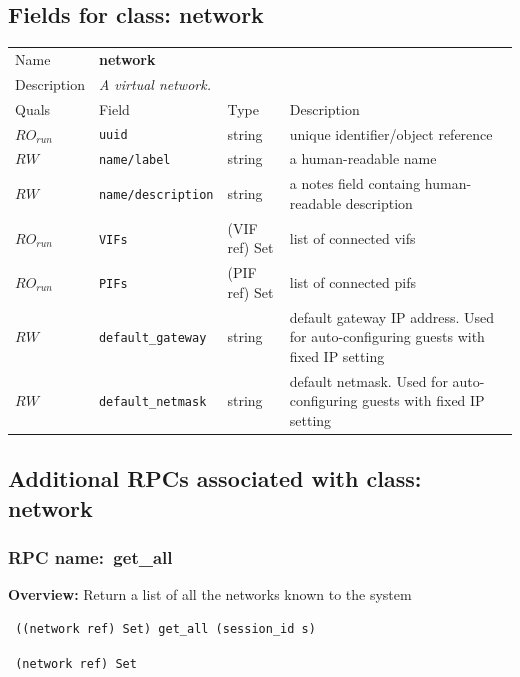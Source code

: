 \subsection{Fields for class: network}
\begin{longtable}{|lllp{}|}
\hline
\multicolumn{1}{|l}{Name} & \multicolumn{3}{l|}{\bf network} \\
\multicolumn{1}{|l}{Description} & \multicolumn{3}{l|}{\parbox{11cm}{\em A
virtual network.}} \\
\hline
Quals & Field & Type & Description \\
\hline
$\mathit{RO}_\mathit{run}$ &  {\tt uuid} & string & unique identifier/object reference \\
$\mathit{RW}$ &  {\tt name/label} & string & a human-readable name \\
$\mathit{RW}$ &  {\tt name/description} & string & a notes field containg human-readable description \\
$\mathit{RO}_\mathit{run}$ &  {\tt VIFs} & (VIF ref) Set & list of connected vifs \\
$\mathit{RO}_\mathit{run}$ &  {\tt PIFs} & (PIF ref) Set & list of connected pifs \\
$\mathit{RW}$ &  {\tt default\_gateway} & string & default gateway IP address. Used for auto-configuring guests with fixed IP setting \\
$\mathit{RW}$ &  {\tt default\_netmask} & string & default netmask. Used for auto-configuring guests with fixed IP setting \\
\hline
\end{longtable}
\subsection{Additional RPCs associated with class: network}
\subsubsection{RPC name:~get\_all}

{\bf Overview:} 
Return a list of all the networks known to the system

\begin{verbatim} ((network ref) Set) get_all (session_id s)\end{verbatim}


\vspace{0.3cm}

{\tt 
(network ref) Set
}


